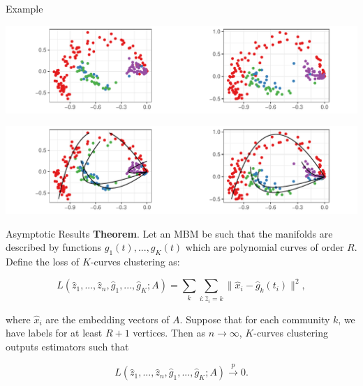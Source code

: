 \documentclass[
  ignorenonframetext,
]{beamer}
\begin{document}
\begin{frame}{Example}
\protect\hypertarget{example}{}
\begin{center}\includegraphics[width=1\linewidth]{slides_files/figure-beamer/mbconnectome-ase-2-1} \end{center}

\begin{center}\includegraphics[width=1\linewidth]{slides_files/figure-beamer/mbconnectome-kcurves-1} \end{center}
\end{frame}

\begin{frame}{Asymptotic Results}
\protect\hypertarget{asymptotic-results}{}
\textbf{Theorem}. Let an MBM be such that the manifolds are described by
functions \(g_1(t), ..., g_K(t)\) which are polynomial curves of order
\(R\). Define the loss of \(K\)-curves clustering as:

\[L(\hat{z}_1, ..., \hat{z}_n, \hat{g}_1, ..., \hat{g}_K; A) = \sum_k \sum_{i : \hat{z}_i = k} \|\hat{x}_{i} - \hat{g}_k(t_{i})\|^2,\]

where \(\hat{x}_i\) are the embedding vectors of \(A\). Suppose that for
each community \(k\), we have labels for at least \(R + 1\) vertices.
Then as \(n \to \infty\), \(K\)-curves clustering outputs estimators
such that

\[L(\hat{z}_1, ..., \hat{z}_n, \hat{g}_1, ..., \hat{g}_K; A) \stackrel{p}{\to} 0.\]
\end{frame}
\end{document}
